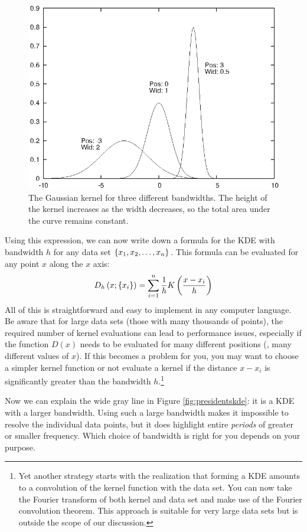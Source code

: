 \begin{figure}
  \centerline{\includegraphics{img/gauss-kernel}}
  \caption{The Gaussian kernel for three different bandwidths.  The
    height of the kernel increases as the width decreases, so the
    total area under the curve remains constant.}
  \label{fig:gausskernel}
\end{figure}

Using this expression, we can now write down a formula for the KDE
with bandwidth $h$ for any data set $\left\{  x_1, x_2, \dots, x_n  \right\} $.
This formula can be evaluated for any point $x$ along the $x$ axis:
%
\[
D_h\left(  x; \left\{  x_i  \right\}   \right) 
  = \sum_{i=1}^n \frac{1}{h} K\left(  \frac{x-x_i}{h}  \right)
\]
%
All of this is straightforward and easy to implement in any computer
language. Be aware that for large data sets (those with many thousands
of points), the required number of kernel evaluations can lead to
performance issues, especially if the function $D(x)$ needs to be
evaluated for many different positions (\ie, many different values of
$x$). If this becomes a problem for you, you may want to choose a
simpler kernel function or not evaluate a kernel if the distance
$x-x_i$ is significantly greater than the bandwidth $h$.\footnote{Yet another strategy starts with the realization that
  forming a KDE amounts to a convolution of the kernel function with
  the data set. You can now take the Fourier transform of both kernel
  and data set and make use of the Fourier convolution theorem.  This
  approach is suitable for very large data sets but is outside the
  scope of our discussion.}

Now we can explain the wide gray line in Figure
\ref{fig:presidentskde}: it is a KDE with a larger bandwidth. Using
such a large bandwidth makes it impossible to resolve the individual
data points, but it does highlight entire \emph{periods} of greater or
smaller frequency. Which choice of bandwidth is right for you depends
on your purpose.

